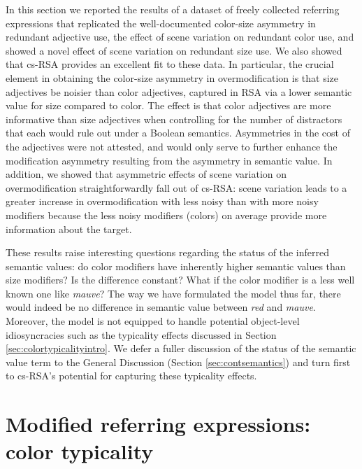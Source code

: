 \documentclass[11pt]{article}
\newcommand{\jd}[1]{\textcolor{Red}{[jd: #1]}}
\newcommand{\sectionref}[1]{Section \ref{#1}}
\begin{document}
In this section we reported the results of a dataset of freely collected referring expressions that replicated the well-documented color-size asymmetry in redundant adjective use, the effect of scene variation on redundant color use, and showed a novel effect of scene variation on redundant size use. We also showed that cs-RSA provides an excellent fit to these data. In particular, the crucial element in obtaining the color-size asymmetry in overmodification is that size adjectives be noisier than  color adjectives, captured in RSA via a lower semantic value for size compared to color. The effect is that color adjectives are more informative than size adjectives when controlling for the number of distractors that each would rule out under a Boolean semantics. Asymmetries in the cost of the adjectives were not attested, and would only serve to further enhance the modification asymmetry resulting from the asymmetry in semantic value. In addition, we showed that asymmetric effects of scene variation on overmodification straightforwardly fall out of cs-RSA: scene variation leads to a greater increase in overmodification with less noisy than with more noisy modifiers because the less noisy modifiers (colors) on average provide more information about the target.

These results raise interesting questions regarding the status of the inferred semantic values: do color modifiers have inherently higher semantic values than size modifiers? Is the difference constant? What if the color modifier is a less well known one like \emph{mauve}? The way we have formulated the model thus far, there would indeed be no difference in semantic value between \emph{red} and \emph{mauve}. Moreover, the model is not equipped to handle potential object-level idiosyncracies such as the typicality effects discussed in \sectionref{sec:colortypicalityintro}. We defer a fuller discussion of the status of the semantic value term to the General Discussion (\sectionref{sec:contsemantics}) and turn first to cs-RSA's potential for capturing these typicality effects.


\section[]{Modified referring expressions: color typicality}
\label{sec:colortypicality}
\end{document}
